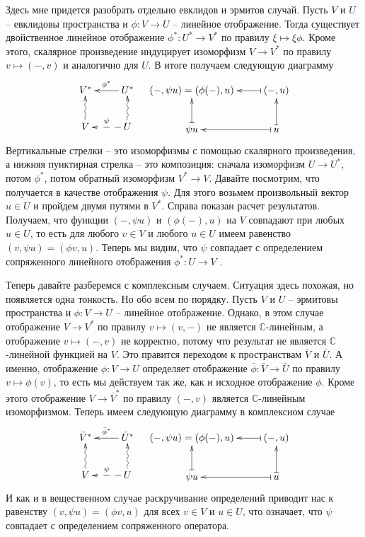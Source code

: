 Здесь мне придется разобрать отдельно евклидов и эрмитов случай. Пусть $V$ и $U$ -- евклидовы пространства и $\phi\colon V\to U$ -- линейное отображение. Тогда существует двойственное линейное отображение $\phi^*\colon U^*\to V^*$ по правилу $\xi \mapsto \xi \phi$. Кроме этого, скалярное произведение индуцирует изоморфизм $V\to V^*$ по правилу $v\mapsto ({-},v)$ и  аналогично для $U$. В итоге получаем следующую диаграмму
\[
\xymatrix{
	{V^*}&{U^*}\ar[l]_{\phi^*}\\
	{V}\ar@{~>}[u]&{U}\ar@{~>}[u]\ar@{-->}[l]_{\psi}
}
\quad
\xymatrix{
	{({-},\psi u) = (\phi({-}), u)}&{({-}, u)}\ar@{|->}[l]\\
	{\psi u}\ar@{|->}[u]&{u}\ar@{|->}[u]\ar@{|->}[l]
}
\]
Вертикальные стрелки -- это изоморфизмы с помощью скалярного произведения, а нижняя пунктирная стрелка -- это композиция: сначала изоморфизм $U\to U^*$, потом $\phi^*$, потом обратный изоморфизм $V^* \to V$. Давайте посмотрим, что получается в качестве отображения $\psi$. Для этого возьмем произвольный вектор $u\in U$ и пройдем двумя путями в $V^*$. Справа показан расчет результатов. Получаем, что функции $({-},\psi u)$ и $(\phi({-}), u)$ на $V$ совпадают при любых $u\in U$, то есть для любого $v\in V$ и любого $u\in U$ имеем равенство $(v, \psi u) = (\phi v, u)$. Теперь мы видим, что $\psi$ совпадает с определением сопряженного линейного отображения $\phi^*\colon U\to V$ .


Теперь давайте разберемся с комплексным случаем. Ситуация здесь похожая, но появляется одна тонкость. Но обо всем по порядку. Пусть $V$ и $U$ -- эрмитовы пространства и $\phi\colon V\to U$ -- линейное отображение. Однако, в этом случае отображение $V\to V^*$ по правилу $v\mapsto (v, {-})$ не является $\mathbb C$-линейным, а отображение $v\mapsto ({-}, v)$ не корректно, потому что результат не является $\mathbb C$-линейной функцией на $V$. Это правится переходом к пространствам $\bar V$ и $\bar U$. А именно, отображение $\phi\colon V\to U$ определяет отображение $\bar \phi\colon \bar V\to \bar U$ по правилу $v\mapsto \phi(v)$, то есть мы действуем так же, как и исходное отображение $\phi$. Кроме этого отображение $V\to \bar V^*$ по правилу $({-}, v)$ является $\mathbb C$-линейным изоморфизмом. Теперь имеем следующую диаграмму в комплексном случае
\[
\xymatrix{
	{\bar V^*}&{\bar U^*}\ar[l]_{\bar \phi^*}\\
	{V}\ar@{~>}[u]&{U}\ar@{~>}[u]\ar@{-->}[l]_{\psi}
}
\quad
\xymatrix{
	{({-},\psi u) = (\phi({-}), u)}&{({-}, u)}\ar@{|->}[l]\\
	{\psi u}\ar@{|->}[u]&{u}\ar@{|->}[u]\ar@{|->}[l]
}
\]
И как и в вещественном случае раскручивание определений приводит нас к равенству $(v, \psi u) = (\phi v, u)$ для всех $v\in V$ и $u\in U$, что означает, что $\psi$ совпадает с определением сопряженного оператора.

